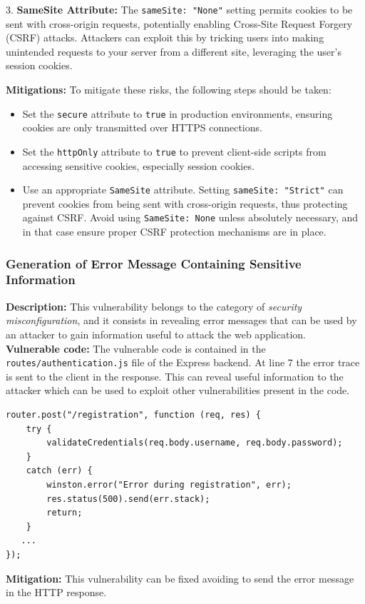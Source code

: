 \documentclass[]{article}
\begin{document}
3. \textbf{SameSite Attribute:}
   The \texttt{sameSite: "None"} setting permits cookies to be sent with cross-origin requests, potentially enabling Cross-Site Request Forgery (CSRF) attacks. Attackers can exploit this by tricking users into making unintended requests to your server from a different site, leveraging the user's session cookies.

\textbf{Mitigations:}  
To mitigate these risks, the following steps should be taken:
\begin{itemize}
    \item Set the \texttt{secure} attribute to \texttt{true} in production environments, ensuring cookies are only transmitted over HTTPS connections.
    \item Set the \texttt{httpOnly} attribute to \texttt{true} to prevent client-side scripts from accessing sensitive cookies, especially session cookies.
    \item Use an appropriate \texttt{SameSite} attribute. Setting \texttt{sameSite: "Strict"} can prevent cookies from being sent with cross-origin requests, thus protecting against CSRF. Avoid using \texttt{SameSite: None} unless absolutely necessary, and in that case ensure proper CSRF protection mechanisms are in place.
\end{itemize}

\subsubsection{Generation of Error Message Containing Sensitive Information}
\textbf{Description:} This vulnerability belongs to the category of {\it security misconfiguration}, and it consists in revealing error messages that can be used by an 
attacker to gain information useful to attack the web application. 
\\
\textbf{Vulnerable code:} The vulnerable code is contained in the \texttt{routes/authentication.js} file of the Express backend. At line 7 the error trace is sent to 
the client in the response. This can reveal useful information to the attacker which can be used to exploit other vulnerabilities present in the code. 
\begin{lstlisting}
router.post("/registration", function (req, res) {
    try {
        validateCredentials(req.body.username, req.body.password);
    }
    catch (err) {
        winston.error("Error during registration", err);
        res.status(500).send(err.stack);
        return;
    }
   ...
});
\end{lstlisting}
\textbf{Mitigation:} This vulnerability can be fixed avoiding to send the error message in the HTTP response.
\end{document}
